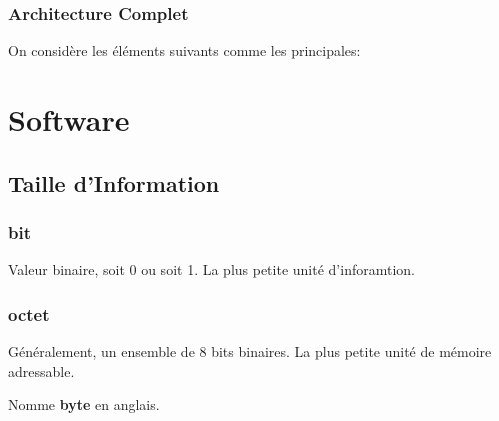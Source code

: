 \documentclass{article}
\begin{document}
\subsubsection{Architecture Complet}
\begin{definition}
    On considère les éléments suivants comme les principales:
    \begin{figure}[H]
        \centering
    \end{figure}
\end{definition}



\section{Software}


\subsection{Taille d'Information}
\subsubsection{bit}
\begin{definition}
    Valeur binaire, soit 0 ou soit 1. La plus petite unité d'inforamtion.
\end{definition}

\subsubsection{octet}
\begin{definition}
    Généralement, un ensemble de 8 bits binaires. La plus petite unité de mémoire adressable.
    
    \begin{remark}
        Nomme \textbf{byte} en anglais.
    \end{remark}
\end{definition}
\end{document}
